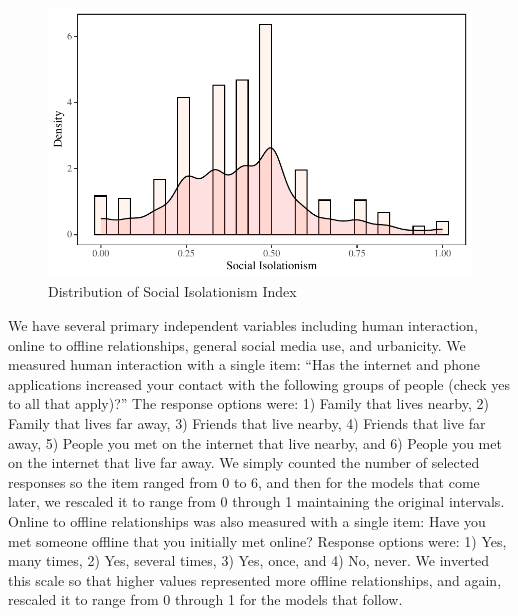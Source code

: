 \documentclass[]{interact}
\theoremstyle{plain}%
\theoremstyle{definition}
\theoremstyle{remark}
\begin{document}
\begin{figure}

{\centering \includegraphics{Social-Isolation-in-China_files/figure-pdf/fig-social-iso-dist-1.pdf}

}

\caption{\label{fig-social-iso-dist}Distribution of Social Isolationism
Index}

\end{figure}

We have several primary independent variables including human
interaction, online to offline relationships, general social media use,
and urbanicity. We measured human interaction with a single item: ``Has
the internet and phone applications increased your contact with the
following groups of people (check yes to all that apply)?'' The response
options were: 1) Family that lives nearby, 2) Family that lives far
away, 3) Friends that live nearby, 4) Friends that live far away, 5)
People you met on the internet that live nearby, and 6) People you met
on the internet that live far away. We simply counted the number of
selected responses so the item ranged from 0 to 6, and then for the
models that come later, we rescaled it to range from 0 through 1
maintaining the original intervals. Online to offline relationships was
also measured with a single item: Have you met someone offline that you
initially met online? Response options were: 1) Yes, many times, 2) Yes,
several times, 3) Yes, once, and 4) No, never. We inverted this scale so
that higher values represented more offline relationships, and again,
rescaled it to range from 0 through 1 for the models that follow.
\end{document}
